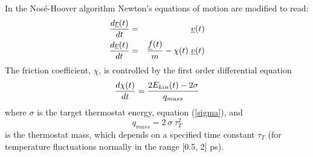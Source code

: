 In the Nos\'e-Hoover algorithm \cite{hoover-85a} Newton's
equations of motion are modified to read:
\begin{eqnarray}
{d \mbox{$\underline{r}$}(t) \over d t} &=& \mbox{$\underline{v}$}(t) \nonumber \\
{d \mbox{$\underline{v}$}(t) \over d t} &=& {\mbox{$\underline{f}$}(t) \over m} - \chi (t) \; \mbox{$\underline{v}$}(t)
\end{eqnarray}
The friction coefficient, $\chi$, is controlled by the first order
differential equation
\begin{equation}
{d \chi (t) \over dt} = {{2 E_{kin}(t) - 2 \sigma} \over q_{mass}}
\end{equation}
where $\sigma$ is the target thermostat energy, equation
(\ref{sigma}), and
\begin{equation}
q_{mass} = 2~\sigma~\tau_{T}^{2}
\end{equation}
is the thermostat mass, which depends on a specified time constant
$\tau_{T}$ (for temperature fluctuations normally in the range [0.5,
2] ps).

